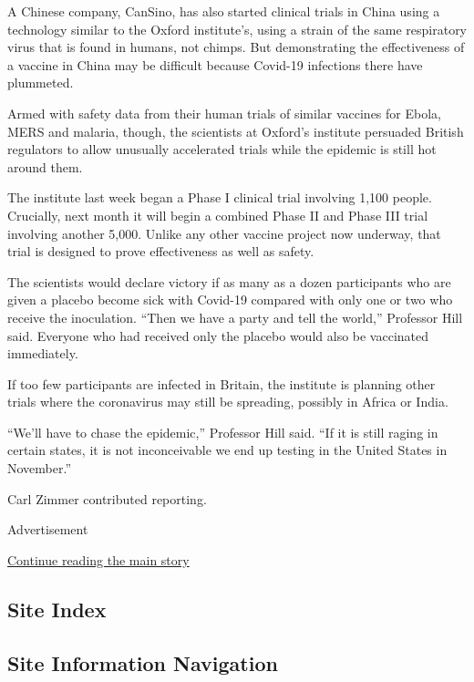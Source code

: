 A Chinese company, CanSino, has also started clinical trials in China
using a technology similar to the Oxford institute's, using a strain of
the same respiratory virus that is found in humans, not chimps. But
demonstrating the effectiveness of a vaccine in China may be difficult
because Covid-19 infections there have plummeted.

Armed with safety data from their human trials of similar vaccines for
Ebola, MERS and malaria, though, the scientists at Oxford's institute
persuaded British regulators to allow unusually accelerated trials while
the epidemic is still hot around them.

The institute last week began a Phase I clinical trial involving 1,100
people. Crucially, next month it will begin a combined Phase II and
Phase III trial involving another 5,000. Unlike any other vaccine
project now underway, that trial is designed to prove effectiveness as
well as safety.

The scientists would declare victory if as many as a dozen participants
who are given a placebo become sick with Covid-19 compared with only one
or two who receive the inoculation. ``Then we have a party and tell the
world,'' Professor Hill said. Everyone who had received only the placebo
would also be vaccinated immediately.

If too few participants are infected in Britain, the institute is
planning other trials where the coronavirus may still be spreading,
possibly in Africa or India.

``We'll have to chase the epidemic,'' Professor Hill said. ``If it is
still raging in certain states, it is not inconceivable we end up
testing in the United States in November.''

Carl Zimmer contributed reporting.

Advertisement

\protect\hyperlink{after-bottom}{Continue reading the main story}

\hypertarget{site-index}{%
\subsection{Site Index}\label{site-index}}

\hypertarget{site-information-navigation}{%
\subsection{Site Information
Navigation}\label{site-information-navigation}}

